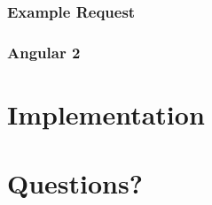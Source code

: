 \documentclass{beamer}
\begin{document}

\begin{frame}
	\frametitle{Example Request}
\end{frame}


\begin{frame}
	\frametitle{Angular 2}
\end{frame}

\section{Implementation}

\section{Questions?}
\end{document}
